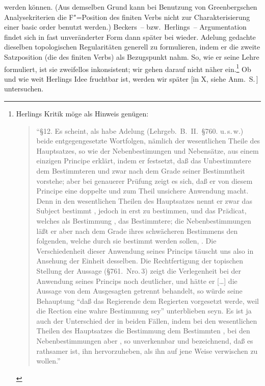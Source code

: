 \documentclass[output=paper]{langsci/langscibook}
\begin{document}
werden können. (Aus demselben Grund kann bei Benutzung von
Greenbergschen Analysekriterien die F"=Position des finiten Verbs nicht
zur Charakterisierung einer basic order benutzt werden.) Beckers~--
bzw.\ Herlings~-- Argumentation findet sich in fast unveränderter Form
dann später bei \citet[35]{Bierwisch1963} wieder. Adelung gedachte
dieselben topologischen Regularitäten generell zu formulieren, indem
er die zweite Satzposition (die des finiten Verbs) als Bezugspunkt
nahm. So, wie er seine Lehre formuliert, ist sie zweifellos
inkonsistent; wir gehen darauf nicht näher ein.\footnote{\label{fn:1-19}%
  Herlings Kritik möge als Hinweis genügen:
  \begin{quote}
  "`§12. Es scheint, als habe Adelung (Lehrgeb.\ B.\ II.\ §760. u.\,s.\,w.) beide entgegengesetzte
    Wortfolgen, nämlich der wesentlichen Theile des Hauptsatzes, so wie der Nebenbestimungen und
    Nebensätze, aus einem einzigen Principe erklärt, indem er festsetzt, daß das Unbestimmtere dem
    Bestimmteren und zwar nach dem Grade seiner Bestimmtheit vorstehe; aber bei genauerer Prüfung
    zeigt es sich, daß er von diesem Principe eine doppelte und zum Theil unsichere Anwendung
    macht. Denn in den wesentlichen Theilen des Hauptsatzes nennt er zwar das Subject bestimmt , jedoch in  erst zu bestimmen, und das Prädicat, welches als
    Bestimmung , das Bestimmtere; die Nebenbestimmungen läßt er aber nach dem Grade
    ihres schwächeren Bestimmens den folgenden, welche durch sie bestimmt werden sollen,
    . Die Verschiedenheit dieser Anwendung seines Princips täuscht uns also in
    Ansehung der Einheit desselben. Die Rechtfertigung der topischen Stellung der Aussage
    (§761.\ Nro.\,3) zeigt die Verlegenheit bei der Anwendung seines Princips noch deutlicher, und
    hätte er [\ldots] die Aussage von dem Ausgesagten getrennt behandelt, so würde seine Behauptung
    "`daß das Regierende dem Regierten vorgesetzt werde, weil die Rection eine wahre Bestimmung sey"'
    unterblieben seyn. Es ist ja auch der Unterschied der  in beiden Fällen, indem bei den
    wesentlichen Theilen des Hauptsatzes die Bestimmung dem Bestimmten , bei den
    Nebenbestimmungen aber , so unverkennbar und bezeichnend, daß es rathsamer ist,
    ihn hervorzuheben, als ihn auf jene Weise verwischen zu wollen."'
    \citep[302f]{Herling1821T}
\end{quote}%
}
Ob und wie weit Herlings Idee fruchtbar ist, werden wir später 
[in X, siehe Anm.\ S.\,\pageref{fn-herausgeber-topo}]\label{X:2} untersuchen.
\end{document}
